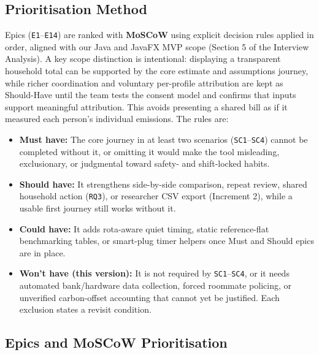 \documentclass[12pt, a4paper]{article}
\begin{document}
\subsection{Prioritisation Method}
Epics (\texttt{E1}--\texttt{E14}) are ranked with \textbf{MoSCoW} using explicit decision rules applied in order, aligned with our Java and JavaFX MVP scope (Section 5 of the Interview Analysis). A key scope distinction is intentional: displaying a transparent household total can be supported by the core estimate and assumptions journey, while richer coordination and voluntary per-profile attribution are kept as Should-Have until the team tests the consent model and confirms that inputs support meaningful attribution. This avoids presenting a shared bill as if it measured each person’s individual emissions. The rules are:
\begin{itemize}
    \item \textbf{Must have:} The core journey in at least two scenarios (\texttt{SC1}--\texttt{SC4}) cannot be completed without it, or omitting it would make the tool misleading, exclusionary, or judgmental toward safety- and shift-locked habits.
    \item \textbf{Should have:} It strengthens side-by-side comparison, repeat review, shared household action (\texttt{RQ3}), or researcher CSV export (Increment 2), while a usable first journey still works without it.
    \item \textbf{Could have:} It adds rota-aware quiet timing, static reference-flat benchmarking tables, or smart-plug timer helpers once Must and Should epics are in place.
    \item \textbf{Won't have (this version):} It is not required by \texttt{SC1}--\texttt{SC4}, or it needs automated bank/hardware data collection, forced roommate policing, or unverified carbon-offset accounting that cannot yet be justified. Each exclusion states a revisit condition.
\end{itemize}

\subsection{Epics and MoSCoW Prioritisation}
\end{document}
